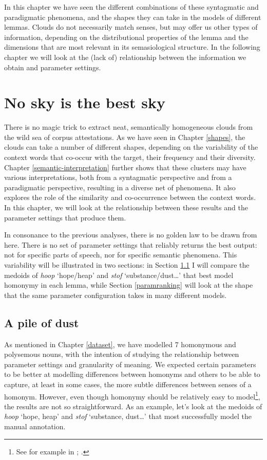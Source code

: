 \documentclass[
]{book}
\begin{document}
In this chapter we have seen the different combinations of these syntagmatic and paradigmatic phenomena, and the shapes they can take in the models of different lemmas. Clouds do not necessarily match senses, but may offer us other types of information, depending on the distributional properties of the lemma and the dimensions that are most relevant in its semasiological structure. In the following chapter we will look at the (lack of) relationship between the information we obtain and parameter settings.

\hypertarget{no-optimal}{%
\chapter{No sky is the best sky}\label{no-optimal}}

There is no magic trick to extract neat, semantically homogeneous clouds from the wild sea of corpus attestations. As we have seen in Chapter \ref{shapes}, the clouds can take a number of different shapes, depending on the variability of the context words that co-occur with the target, their frequency and their diversity. Chapter \ref{semantic-interpretation} further shows that these clusters may have various interpretations, both from a syntagmatic perspective and from a paradigmatic perspective, resulting in a diverse net of phenomena. It also explores the role of the similarity and co-occurrence between the context words. In this chapter, we will look at the relationship between these results and the parameter settings that produce them.

In consonance to the previous analyses, there is no golden law to be drawn from here. There is no set of parameter settings that reliably returns the best output: not for specific parts of speech, nor for specific semantic phenomena.
This variability will be illustrated in two sections: in Section \ref{hoopstof} I will compare the medoids of \emph{hoop} `hope/heap' and \emph{stof} `substance/dust\ldots{}' that best model homonymy in each lemma, while Section \ref{paramranking} will look at the shape that the same parameter configuration takes in many different models.

\hypertarget{hoopstof}{%
\section{A pile of dust}\label{hoopstof}}

As mentioned in Chapter \ref{dataset}, we have modelled 7 homonymous and polysemous nouns, with the intention of studying the relationship between parameter settings and granularity of meaning. We expected certain parameters to be better at modelling differences between homonyms and others to be able to capture, at least in some cases, the more subtle differences between senses of a homonym. However, even though homonymy should be relatively easy to model\footnote{See for example in \textcite{schutze_1998}; \textcite{yarowsky_1995}.}, the results are not so straightforward. As an example, let's look at the medoids of \emph{hoop} `hope, heap' and \emph{stof} `substance, dust\ldots{}' that most successfully model the manual annotation.
\end{document}
